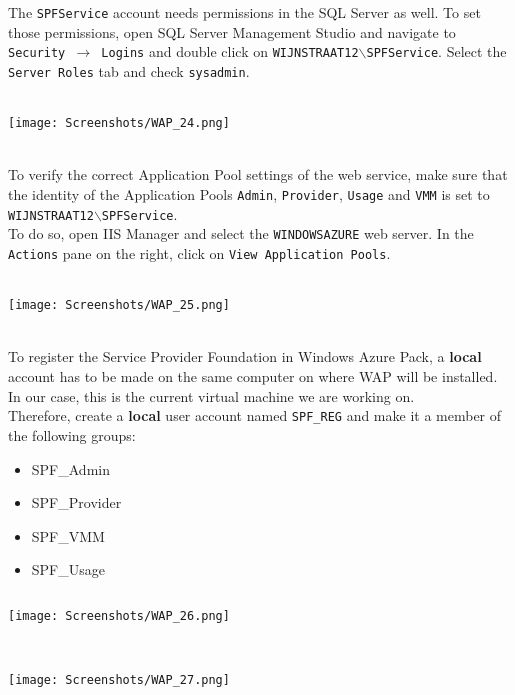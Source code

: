 The \texttt{SPFService} account needs permissions in the SQL Server as well. To set those permissions, open SQL Server Management Studio and navigate to \texttt{Security $\rightarrow$ Logins} and double click on \texttt{WIJNSTRAAT12$\backslash$SPFService}. Select the \texttt{Server Roles} tab and check \texttt{sysadmin}.
$\;$ \\ \\
\noindent\begin{minipage}{\textwidth}
    \centering
    \texttt{[image: Screenshots/WAP\_24.png]}
\end{minipage}
$\;$ \\ \\
To verify the correct Application Pool settings of the web service, make sure that the identity of the Application Pools \texttt{Admin}, \texttt{Provider}, \texttt{Usage} and \texttt{VMM} is set to \texttt{WIJNSTRAAT12$\backslash$SPFService}. \\
To do so, open IIS Manager and select the \texttt{WINDOWSAZURE} web server. In the \texttt{Actions} pane on the right, click on \texttt{View Application Pools}.
$\;$ \\ \\
\noindent\begin{minipage}{\textwidth}
    \centering
    \texttt{[image: Screenshots/WAP\_25.png]}
\end{minipage}
$\;$ \\ \\
To register the Service Provider Foundation in Windows Azure Pack, a \textbf{local} account has to be made on the same computer on where WAP will be installed. In our case, this is the current virtual machine we are working on. \\
Therefore, create a \textbf{local} user account named \texttt{SPF\_REG} and make it a member of the following groups:
\begin{itemize}
\item SPF\_Admin
\item SPF\_Provider
\item SPF\_VMM
\item SPF\_Usage
\end{itemize}
$\;$ \\
\noindent\begin{minipage}{\textwidth}
    \centering
    \texttt{[image: Screenshots/WAP\_26.png]}
\end{minipage}
$\;$ \\ \\
\noindent\begin{minipage}{\textwidth}
    \centering
    \texttt{[image: Screenshots/WAP\_27.png]}
\end{minipage}

